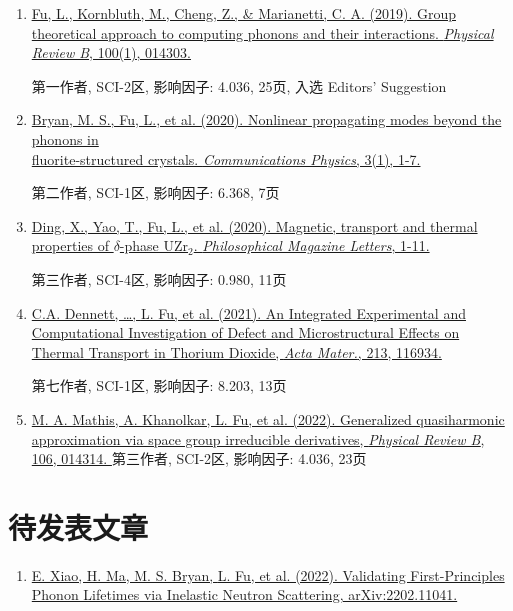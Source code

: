 \documentclass[
  a4paper,
  12pt
]{cv}
\begin{document}
\begin{enumerate}
\item
\href{https://doi.org/10.1103/PhysRevB.100.014303}
{\underline{Fu, L.}, Kornbluth, M., Cheng, Z., \& Marianetti, C. A. (2019). 
Group theoretical approach to computing phonons and their interactions. 
\textit{Physical Review B}, 100(1), 014303.}

第一作者, SCI-2区, 影响因子: 4.036, 25页, 入选 Editors' Suggestion
%
\item
\href{https://doi.org/10.1038/s42005-020-00483-2}{
Bryan, M. S., \underline{Fu, L.}, et al. (2020). 
Nonlinear propagating modes beyond the phonons in \\fluorite-structured crystals.
\textit{Communications Physics}, 3(1), 1-7.}

第二作者, SCI-1区, 影响因子: 6.368, 7页
%
\item
\href{https://doi.org/10.1080/09500839.2020.1833375}{
Ding, X., Yao, T., \underline{Fu, L.}, et al. (2020).
Magnetic, transport and thermal properties of $\delta$-phase UZr$_{2}$.
\textit{Philosophical Magazine Letters}, 1-11.}

第三作者, SCI-4区, 影响因子: 0.980, 11页
%
\item
\href{https://doi.org/10.1016/j.actamat.2021.116934}{
C.A. Dennett, \dots, \underline{L. Fu}, et al. (2021).
An Integrated Experimental and Computational Investigation of Defect and Microstructural Effects on Thermal Transport in Thorium Dioxide, %
\textit{Acta Mater.}, 213, 116934.
}

第七作者, SCI-1区, 影响因子: 8.203, 13页
%
\item
\href{https://doi.org/10.1103/PhysRevB.106.014314}{
M. A. Mathis, A. Khanolkar, \underline{L. Fu}, et al. (2022).
Generalized quasiharmonic approximation via space group irreducible derivatives,
\textit{Physical Review B}, 106, 014314.
}
第三作者, SCI-2区, 影响因子: 4.036, 23页
%
\end{enumerate}


\section{待发表文章}

\begin{enumerate}
\item
\href{https://arxiv.org/abs/2202.11041}{
E. Xiao, H. Ma, M. S. Bryan, \underline{L. Fu}, et al. (2022).
Validating First-Principles Phonon Lifetimes via Inelastic Neutron Scattering,
arXiv:2202.11041.
}
\end{enumerate}
\end{document}

